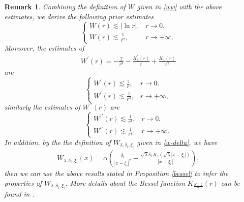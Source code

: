 \documentclass[a4paper,reqno,11pt,oneside]{amsart}
\numberwithin{equation}{section}
\newtheorem{Rem}[Thm]{Remark}
\begin{document}
 \begin{Rem}\label{bessel-2}
  Combining the definition of $W$ given in \eqref{ww} with the above estimates, we derive the following prior estimates 
    \begin{equation}\label{properties-1}
    \begin{cases}
        W(r)\lesssim |\ln{r}|, &r\to 0.\\
        W(r)\lesssim \frac{1}{r^{2}},&r\to +\infty.
    \end{cases}
    \end{equation}
  Moreover, the estimates of 
  \begin{align*}
      \label{w-prime}W^{\prime}(r)= -\frac{2}{r^3}-\frac{K_1^{\prime}(r)}{r}+\frac{K_1(r)}{r^2}
  \end{align*}  are \begin{equation}\label{properties-2}
    \begin{cases}
        W^{\prime}(r)\lesssim \frac{1}{r}, &r\to 0.\\
        W^{\prime}(r)\lesssim \frac{1}{r^{3}},&r\to +\infty,
    \end{cases}
    \end{equation}
similarly the estimates of  $W^{\prime\prime}(r)$ are \begin{equation}\label{properties-3}
    \begin{cases}
        W^{\prime\prime}(r)\lesssim \frac{1}{r^2}, &r\to 0.\\
        W^{\prime\prime}(r)\lesssim \frac{1}{r^{4}},&r\to +\infty.
    \end{cases}
    \end{equation}
 In addition, by the the definition of $W_{\lambda,\delta_i,\xi_i}$ given in \eqref{w-delta}, we have
\begin{align}\label{ww-1} 
        W_{\lambda,\delta_i,\xi_i}(x)= \alpha\left(\frac{\delta_i}{|x-\xi_i|^2}-\frac{\sqrt{\lambda}\delta_i\, K_{1}(\sqrt{\lambda}|x-\xi_i|)}{|x-\xi_i|}\right),
    \end{align}
    then we can use the above results stated in Proposition \ref{bessel} to infer the properties of 
 $W_{\lambda,\delta_i,\xi_i}$.  More details about the Bessel function $K_{\frac{N-2}{2}}(r)$ can be found in \cite{1999-REY}. 
    \end{Rem}
\end{document}
